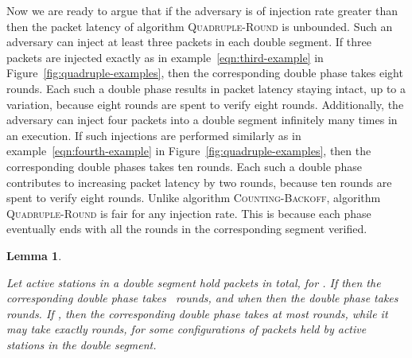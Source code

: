 \documentclass[11pt]{article}
\newtheorem{lemma}{Lemma}
\begin{document}
Now we are ready to argue that if the adversary is of injection rate greater than  then the packet latency of algorithm \textsc{Quadruple-Round}  is unbounded.
Such an adversary can inject at least three packets in each double segment.
If three packets are injected exactly as in example~\eqref{eqn:third-example} in Figure~\ref{fig:quadruple-examples}, then the corresponding double phase takes eight rounds.
Each such a double phase results in packet latency staying intact, up to a  variation, because eight rounds are spent to verify eight rounds.
Additionally, the adversary can inject four packets into a double segment infinitely many times in an execution.
If such injections are performed similarly as in example~\eqref{eqn:fourth-example} in Figure~\ref{fig:quadruple-examples}, then the corresponding double phases takes ten rounds.
Each such a double phase contributes to increasing packet latency by two rounds, because ten rounds are spent to verify eight rounds.
Unlike algorithm \textsc{Counting-Backoff}, algorithm \textsc{Quadruple-Round} is fair for any injection rate.
This is because each phase eventually ends with all the rounds in the corresponding segment verified.



\begin{lemma}
\label{lem:linear-time}

Let active stations in a double segment hold  packets in total, for . 
If  then the corresponding double phase takes~ rounds, and when  then the double phase takes~ rounds.
If , then the corresponding double phase takes at most  rounds, while it may take exactly  rounds, for some configurations of packets held by active stations in the double segment.
\end{lemma}
\end{document}
